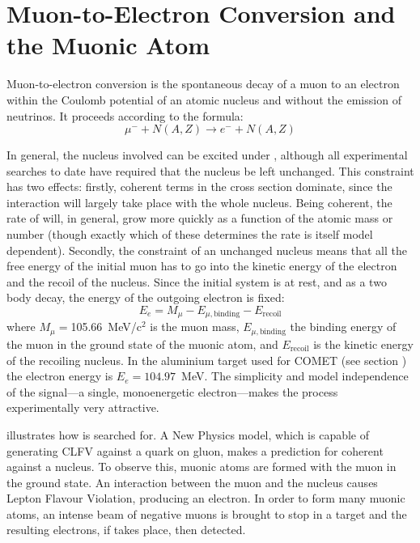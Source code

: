 
\chapter{Muon-to-Electron Conversion and the Muonic Atom}
Muon-to-electron conversion is the spontaneous decay of a muon to an electron within the Coulomb potential of an atomic nucleus and without the emission of neutrinos.
It proceeds according to the formula:
\begin{equation}
\mu^{-}+N(A,Z) \rightarrow e^{-}+N(A,Z)
\end{equation}

In general, the nucleus involved can be excited under \mueconv, although all experimental searches to date have required that the nucleus be left unchanged.
This constraint has two effects: firstly, coherent terms in the \mueconv cross section dominate, since the interaction will largely take place with the whole nucleus.
Being coherent, the rate of \mueconv will, in general, grow more quickly as a function of the atomic mass or number (though exactly which of these determines the rate is itself model dependent).
Secondly, the constraint of an unchanged nucleus means that all the free energy of the initial muon has to go into the kinetic energy of the electron and the recoil of the nucleus.
Since the initial system is at rest, and as a two body decay, the energy of the outgoing electron is fixed:
\begin{equation}
E_e=M_\mu-E_{\mu,\mathrm{binding}}-E_\mathrm{recoil}
\end{equation}
where $M_\mu=$105.66~MeV/c$^2$ is the muon mass, $E_{\mu,\mathrm{binding}}$ the
binding energy of the muon in the ground state of the muonic atom, and
$E_\mathrm{recoil}$ is the kinetic energy of the recoiling nucleus.
In the aluminium target used for COMET (see section ) the electron energy is $E_e=104.97$~MeV.
The simplicity and model independence of the signal---a single, monoenergetic electron---makes the process experimentally very attractive.

\FigMuecCreation
{} illustrates how \mueconv is searched for.
A New Physics model, which is capable of generating \ac{CLFV} against a quark on gluon, makes a prediction for coherent \mueconv against a nucleus.
To observe this, muonic atoms are formed with the muon in the ground state.
An interaction between the muon and the nucleus causes Lepton Flavour Violation, producing an electron.
In order to form many muonic atoms, an intense beam of negative muons is brought to stop in a target and the resulting electrons, if \mueconv takes place, then detected.

